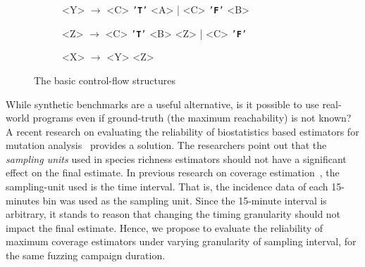 \documentclass[conference]{IEEEtran}
\def\term#1{\texttt{'\textbf{#1}'}}
\begin{document}
\begin{figure*}
\begin{subfigure}[h]{0.3\textwidth}
\begin{grammar}\centering
    <Y> $\rightarrow$ <C> \term{T} <A> | <C> \term{F} <B>
\end{grammar}
\end{subfigure}
\begin{subfigure}[h]{0.3\textwidth}
\begin{grammar}\centering
  <Z> $\rightarrow$ <C> \term{T} <B> <Z> | <C> \term{F}
\end{grammar}
\end{subfigure}
\begin{subfigure}[h]{0.3\textwidth}
\begin{grammar}\centering
  <X> $\rightarrow$ <Y> <Z>
\end{grammar}
\end{subfigure}
%
\caption{The basic control-flow structures}
\label{fig:cfg}
\end{figure*}

While synthetic benchmarks are a useful alternative, is it possible to use
real-world programs even if ground-truth (the maximum reachability) is not
known? A recent research on evaluating the reliability of biostatistics based
estimators for mutation analysis~\cite{Kuznetsov2024empirical} provides a
solution. The researchers point out that the \emph{sampling units} used in
species richness estimators should not have a significant effect on the final
estimate. In previous research on coverage estimation~\cite{liyanage2023reachable},
the sampling-unit used is the time interval. That is, the incidence data of
each 15-minutes bin was used as the sampling unit. Since the 15-minute interval
is arbitrary, it stands to reason that changing the timing granularity should
not impact the final estimate. Hence, we propose to evaluate the reliability of
maximum coverage estimators under varying granularity of sampling interval,
for the same fuzzing campaign duration.

\end{document}
